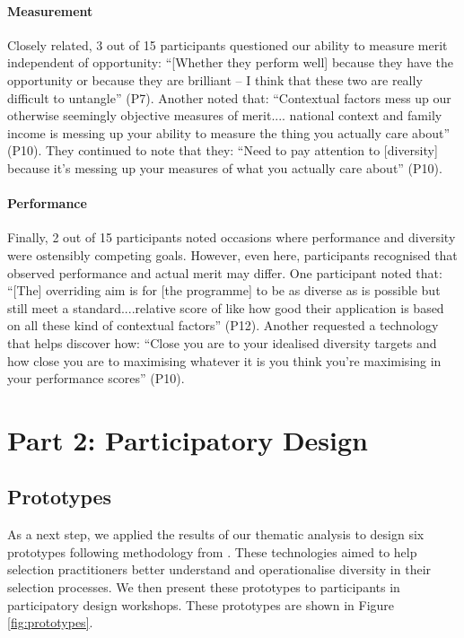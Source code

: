 \paragraph{Measurement}
Closely related, 3 out of 15 participants questioned our ability to measure merit independent of opportunity: ``[Whether they perform well] because they have the opportunity or because they are brilliant – I think that these two are really difficult to untangle'' (P7). Another noted that: ``Contextual factors mess up our otherwise seemingly objective measures of merit.... national context and family income is messing up your ability to measure the thing you actually care about'' (P10). They continued to note that they: ``Need to pay attention to [diversity] because it's messing up your measures of what you actually care about'' (P10).

\paragraph{Performance}
Finally, 2 out of 15 participants noted occasions where performance and diversity were ostensibly competing goals. However, even here, participants recognised that observed performance and actual merit may differ. One participant noted that: ``[The] overriding aim is for [the programme] to be as diverse as is possible but still meet a standard....relative score of like how good their application is based on all these kind of contextual factors'' (P12). Another requested a technology that helps discover how: ``Close you are to your idealised diversity targets and how close you are to maximising whatever it is you think you're maximising in your performance scores'' (P10).

\section{Part 2: Participatory Design}\label{sec:study2}
\subsection{Prototypes}
As a next step, we applied the results of our thematic analysis to design six prototypes following methodology from \textcite{Buchenau_Suri_2000}. These technologies aimed to help selection practitioners better understand and operationalise diversity in their selection processes. We then present these prototypes to participants in participatory design workshops. These prototypes are shown in Figure \ref{fig:prototypes}.

